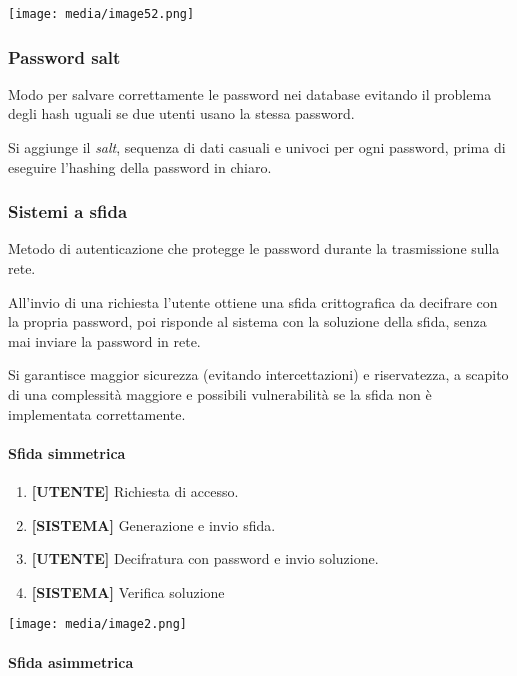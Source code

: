 \texttt{[image: media/image52.png]}

\subsubsection{Password salt}\label{password-salt}

Modo per salvare correttamente le password nei database evitando il
problema degli hash uguali se due utenti usano la stessa password.

Si aggiunge il \emph{salt}, sequenza di dati casuali e univoci per ogni
password, prima di eseguire l'hashing della password in chiaro.

\subsubsection{Sistemi a sfida}\label{sistemi-a-sfida}

Metodo di autenticazione che protegge le password durante la
trasmissione sulla rete.

All'invio di una richiesta l'utente ottiene una sfida crittografica da
decifrare con la propria password, poi risponde al sistema con la
soluzione della sfida, senza mai inviare la password in rete.

Si garantisce maggior sicurezza (evitando intercettazioni) e
riservatezza, a scapito di una complessità maggiore e possibili
vulnerabilità se la sfida non è implementata correttamente.

\paragraph{Sfida simmetrica}\label{sfida-simmetrica}

\begin{enumerate}
\def\labelenumi{\arabic{enumi}.}
\item
  \textbf{{[}UTENTE{]}} Richiesta di accesso.
\item
  \textbf{{[}SISTEMA{]}} Generazione e invio sfida.
\item
  \textbf{{[}UTENTE{]}} Decifratura con password e invio soluzione.
\item
  \textbf{{[}SISTEMA{]}} Verifica soluzione
\end{enumerate}

\texttt{[image: media/image2.png]}

\paragraph{Sfida asimmetrica}\label{sfida-asimmetrica}

